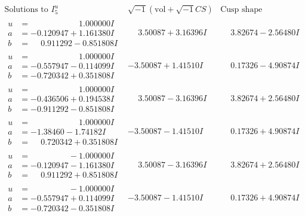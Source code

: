 \documentclass[1p]{elsarticle_modified}
\theoremstyle{definition}
\newcommand{\I}{\sqrt{-1}}
\begin{document}
$$\begin{array}{c|c|c}  
\text{Solutions to }I^u_{5}& \I (\text{vol} + \sqrt{-1}CS) & \text{Cusp shape}\\
 \hline 
\begin{aligned}
u &= \phantom{-0.000000 -}1.000000 I \\
a &= -0.120947 + 1.161380 I \\
b &= \phantom{-}0.911292 - 0.851808 I\end{aligned}
 & \phantom{-}3.50087 + 3.16396 I & \phantom{-}3.82674 - 2.56480 I \\ \hline\begin{aligned}
u &= \phantom{-0.000000 -}1.000000 I \\
a &= -0.557947 - 0.114099 I \\
b &= -0.720342 + 0.351808 I\end{aligned}
 & -3.50087 + 1.41510 I & \phantom{-}0.17326 - 4.90874 I \\ \hline\begin{aligned}
u &= \phantom{-0.000000 -}1.000000 I \\
a &= -0.436506 + 0.194538 I \\
b &= -0.911292 - 0.851808 I\end{aligned}
 & \phantom{-}3.50087 - 3.16396 I & \phantom{-}3.82674 + 2.56480 I \\ \hline\begin{aligned}
u &= \phantom{-0.000000 -}1.000000 I \\
a &= -1.38460 - 1.74182 I \\
b &= \phantom{-}0.720342 + 0.351808 I\end{aligned}
 & -3.50087 - 1.41510 I & \phantom{-}0.17326 + 4.90874 I \\ \hline\begin{aligned}
u &= \phantom{-0.000000 } -1.000000 I \\
a &= -0.120947 - 1.161380 I \\
b &= \phantom{-}0.911292 + 0.851808 I\end{aligned}
 & \phantom{-}3.50087 - 3.16396 I & \phantom{-}3.82674 + 2.56480 I \\ \hline\begin{aligned}
u &= \phantom{-0.000000 } -1.000000 I \\
a &= -0.557947 + 0.114099 I \\
b &= -0.720342 - 0.351808 I\end{aligned}
 & -3.50087 - 1.41510 I & \phantom{-}0.17326 + 4.90874 I \\ \hline\begin{aligned}

\end{aligned}
\end{array}$$
\end{document}

